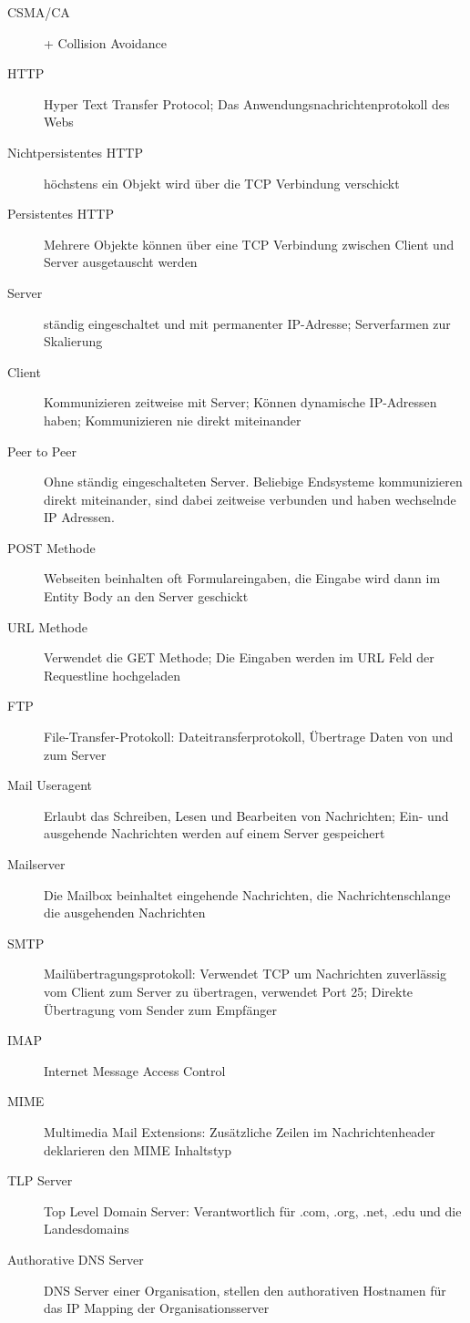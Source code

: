 \documentclass[10pt,landscape]{article}
\begin{document}
\begin{multicols}{3}
\begin{description}
    \item[CSMA/CA] + Collision Avoidance
    \item[HTTP] Hyper Text Transfer Protocol; Das Anwendungsnachrichtenprotokoll des Webs
    \item[Nichtpersistentes HTTP] höchstens ein Objekt wird über die TCP Verbindung verschickt
    \item[Persistentes HTTP ] Mehrere Objekte können über eine TCP Verbindung zwischen Client und Server ausgetauscht werden
    \item[Server] ständig eingeschaltet und mit permanenter IP-Adresse; Serverfarmen zur Skalierung
    \item[Client] Kommunizieren zeitweise mit Server; Können dynamische IP-Adressen haben; Kommunizieren nie direkt miteinander
    \item[Peer to Peer] Ohne ständig eingeschalteten Server. Beliebige Endsysteme kommunizieren direkt miteinander, sind dabei zeitweise verbunden und haben wechselnde IP Adressen.
    \item[POST Methode] Webseiten beinhalten oft Formulareingaben, die Eingabe wird dann im Entity Body an den Server geschickt
    \item[URL Methode] Verwendet die GET Methode; Die Eingaben werden im URL Feld der Requestline hochgeladen
    \item[FTP] File-Transfer-Protokoll: Dateitransferprotokoll, Übertrage Daten von und zum Server
    \item[Mail Useragent] Erlaubt das Schreiben, Lesen und Bearbeiten von Nachrichten; Ein- und ausgehende Nachrichten werden auf einem Server gespeichert
    \item[Mailserver] Die Mailbox beinhaltet eingehende Nachrichten, die Nachrichtenschlange die ausgehenden Nachrichten
    \item[SMTP] Mailübertragungsprotokoll: Verwendet TCP um Nachrichten zuverlässig vom Client zum Server zu übertragen, verwendet Port 25; Direkte Übertragung vom Sender zum Empfänger 
    \item[IMAP] Internet Message Access Control 
    \item[MIME] Multimedia Mail Extensions: Zusätzliche Zeilen im Nachrichtenheader deklarieren den MIME Inhaltstyp
    \item[TLP Server] Top Level Domain Server: Verantwortlich für .com, .org, .net, .edu und die Landesdomains
    \item[Authorative DNS Server] DNS Server einer Organisation, stellen den authorativen Hostnamen für das IP Mapping der Organisationsserver

\end{description}
\end{multicols}
\end{document}
